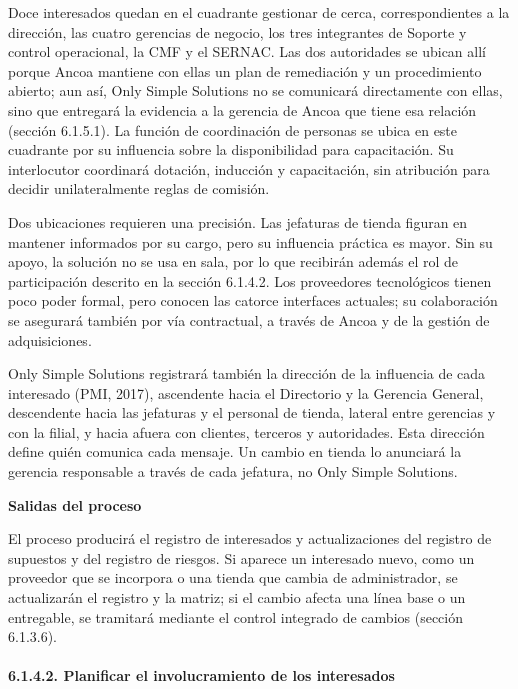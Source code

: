 \documentclass[11pt]{article}
\begin{document}
Doce interesados quedan en el cuadrante gestionar de cerca,
correspondientes a la dirección, las cuatro gerencias de negocio, los
tres integrantes de Soporte y control operacional, la CMF y el SERNAC.
Las dos autoridades se ubican allí porque Ancoa mantiene con ellas un
plan de remediación y un procedimiento abierto; aun así, Only Simple
Solutions no se comunicará directamente con ellas, sino que entregará la
evidencia a la gerencia de Ancoa que tiene esa relación (sección
6.1.5.1). La función de coordinación de personas se ubica en este
cuadrante por su influencia sobre la disponibilidad para capacitación.
Su interlocutor coordinará dotación, inducción y capacitación, sin
atribución para decidir unilateralmente reglas de comisión.

Dos ubicaciones requieren una precisión. Las jefaturas de tienda figuran
en mantener informados por su cargo, pero su influencia práctica es
mayor. Sin su apoyo, la solución no se usa en sala, por lo que recibirán
además el rol de participación descrito en la sección 6.1.4.2. Los
proveedores tecnológicos tienen poco poder formal, pero conocen las
catorce interfaces actuales; su colaboración se asegurará también por
vía contractual, a través de Ancoa y de la gestión de adquisiciones.

Only Simple Solutions registrará también la dirección de la influencia
de cada interesado (PMI, 2017), ascendente hacia el Directorio y la
Gerencia General, descendente hacia las jefaturas y el personal de
tienda, lateral entre gerencias y con la filial, y hacia afuera con
clientes, terceros y autoridades. Esta dirección define quién comunica
cada mensaje. Un cambio en tienda lo anunciará la gerencia responsable a
través de cada jefatura, no Only Simple Solutions.

\textbf{Salidas del proceso}

El proceso producirá el registro de interesados y actualizaciones del
registro de supuestos y del registro de riesgos. Si aparece un
interesado nuevo, como un proveedor que se incorpora o una tienda que
cambia de administrador, se actualizarán el registro y la matriz; si el
cambio afecta una línea base o un entregable, se tramitará mediante el
control integrado de cambios (sección 6.1.3.6).

\paragraph{6.1.4.2. Planificar el involucramiento de los interesados}\label{6-1-4-2-planificar-el-involucramiento-de-los-interesados}
\end{document}
